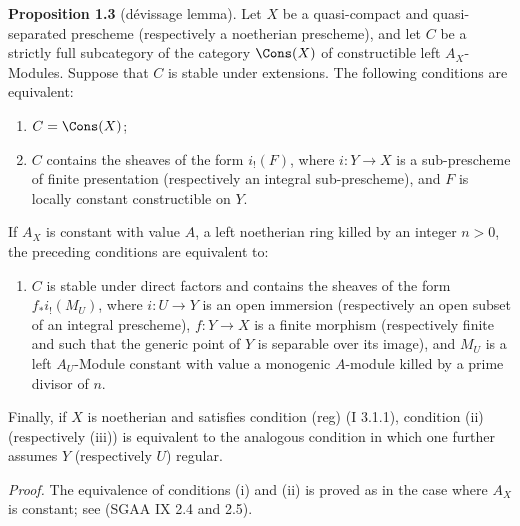 \textbf{Proposition 1.3} (dévissage lemma). Let $X$ be a quasi-compact and quasi-separated prescheme (respectively a noetherian prescheme), and let $C$ be a strictly full subcategory of the category $\Cons(X)$ of constructible left $A_X$-Modules. Suppose that $C$ is stable under extensions. The following conditions are equivalent:
\begin{enumerate}[label=(\roman*)]
\item $C=\Cons(X)$;
\item $C$ contains the sheaves of the form $i_!(F)$, where $i:Y\to X$ is a sub-prescheme of finite presentation (respectively an integral sub-prescheme), and $F$ is locally constant constructible on $Y$.
\end{enumerate}
If $A_X$ is constant with value $A$, a left noetherian ring killed by an integer $n>0$, the preceding conditions are equivalent to:
\begin{enumerate}[label=(\roman*),start=3]
\item $C$ is stable under direct factors and contains the sheaves of the form $f_*i_!(M_U)$, where $i:U\to Y$ is an open immersion (respectively an open subset of an integral prescheme), $f:Y\to X$ is a finite morphism (respectively finite and such that the generic point of $Y$ is separable over its image), and $M_U$ is a left $A_U$-Module constant with value a monogenic $A$-module killed by a prime divisor of $n$.
\end{enumerate}
Finally, if $X$ is noetherian and satisfies condition (reg) (I 3.1.1), condition (ii) (respectively (iii)) is equivalent to the analogous condition in which one further assumes $Y$ (respectively $U$) regular.

\emph{Proof.} The equivalence of conditions (i) and (ii) is proved as in the case where $A_X$ is constant; see (SGAA IX 2.4 and 2.5).

